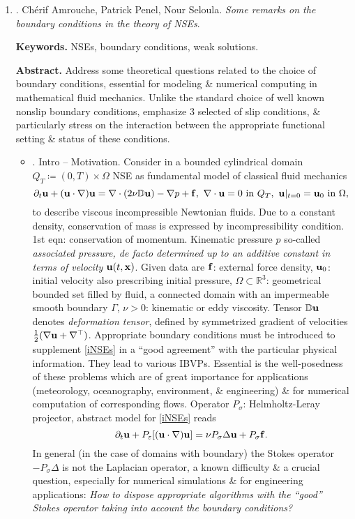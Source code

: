 \documentclass{article}
\begin{document}
\begin{enumerate}
	\item \cite{Amrouche_Penel_Seloula2013}. {\sc Ch\'{e}rif Amrouche, Patrick Penel, Nour Seloula}. {\it Some remarks on the boundary conditions in the theory of NSEs}. {\sf[19 citations]}
	
	{\bf Keywords.} NSEs, boundary conditions, weak solutions.
	
	{\bf Abstract.} Address some theoretical questions related to the choice of boundary conditions, essential for modeling \& numerical computing in mathematical fluid mechanics. Unlike the standard choice of well known nonslip boundary conditions, emphasize 3 selected of slip conditions, \& particularly stress on the interaction between the appropriate functional setting \& status of these conditions.
	\begin{itemize}
		\item {. Intro -- Motivation.} Consider in a bounded cylindrical domain $Q_T\coloneqq(0,T)\times\Omega$ NSE as fundamental model of classical fluid mechanics
		\begin{equation}
			\label{iNSEs}
			\partial_t{\bf u} + ({\bf u}\cdot\nabla){\bf u} = \nabla\cdot(2\nu\mathbb{D}{\bf u}) - \nabla p + {\bf f},\ \nabla\cdot{\bf u} = 0\mbox{ in } Q_T,\ {\bf u}|_{t=0} = {\bf u}_0\mbox{ in }\Omega,
		\end{equation}
		to describe viscous incompressible Newtonian fluids. Due to a constant density, conservation of mass is expressed by incompressibility condition. 1st eqn: conservation of momentum. Kinematic pressure $p$ so-called {\it associated pressure, de facto determined up to an additive constant in terms of velocity ${\bf u}(t,{\bf x})$}. Given data are ${\bf f}$: external force density, ${\bf u}_0$: initial velocity also prescribing initial pressure, $\Omega\subset\mathbb{R}^3$: geometrical bounded set filled by fluid, a connected domain with an impermeable smooth boundary $\Gamma$, $\nu > 0$: kinematic or eddy viscosity. Tensor $\mathbb{D}{\bf u}$ denotes {\it deformation tensor}, defined by symmetrized gradient of velocities $\frac{1}{2}(\nabla{\bf u} + \nabla^\top)$. Appropriate boundary conditions must be introduced to supplement \eqref{iNSEs} in a ``good agreement'' with the particular physical information. They lead to various IBVPs. Essential is the well-posedness of these problems which are of great importance for applications (meteorology, oceanography, environment, \& engineering) \& for numerical computation of corresponding flows. Operator $P_\sigma$: Helmholtz-Leray projector, abstract model for \eqref{iNSEs} reads
		\begin{equation}
			\label{iNSEs abstract}
			\partial_t{\bf u} + P_\varepsilon[({\bf u}\cdot\nabla){\bf u}] = \nu P_\sigma\Delta{\bf u} + P_\sigma{\bf f}.
		\end{equation}
		In general (in the case of domains with boundary) the Stokes operator $-P_\sigma\Delta$ is not the Laplacian operator, a known difficulty \& a crucial question, especially for numerical simulations \& for engineering applications: {\it How to dispose appropriate algorithms with the ``good'' Stokes operator taking into account the boundary conditions?}
		

\end{itemize}
\end{enumerate}
\end{document}
